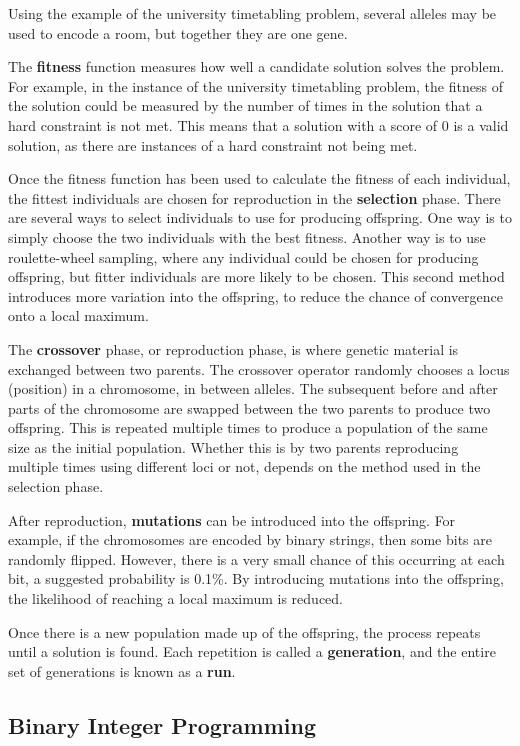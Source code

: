 \documentclass[a4paper, 12pt]{report}
\begin{document}
Using the example of the university timetabling problem, several alleles may be
used to encode a room, but together they are one gene.

The \textbf{fitness} function measures how well a candidate solution solves the
problem.
For example, in the instance of the university timetabling problem, the fitness 
of the solution could be measured by the number of times in the solution that a
hard constraint is not met.
This means that a solution with a score of 0 is a valid solution, as there are
instances of a hard constraint not being met.

Once the fitness function has been used to calculate the fitness of each
individual, the fittest individuals are chosen for reproduction in the
\textbf{selection} phase.
There are several ways to select individuals to use for producing offspring.
One way is to simply choose the two individuals with the best fitness.
Another way is to use roulette-wheel sampling, where any individual could be
chosen for producing offspring, but fitter individuals are more likely to be
chosen.
This second method introduces more variation into the offspring, to reduce the
chance of convergence onto a local maximum.

The \textbf{crossover} phase, or reproduction phase, is where genetic material
is exchanged between two parents.
The crossover operator randomly chooses a locus (position) in a chromosome,
in between alleles.
The subsequent before and after parts of the chromosome are swapped between the
two parents to produce two offspring.
This is repeated multiple times to produce a population of the same size as the
initial population.
Whether this is by two parents reproducing multiple times using different loci
or not, depends on the method used in the selection phase.

After reproduction, \textbf{mutations} can be introduced into the offspring. 
For example, if the chromosomes are encoded by binary strings, then some bits 
are randomly flipped.
However, there is a very small chance of this occurring at each bit, a suggested
probability is 0.1\%.
By introducing mutations into the offspring, the likelihood of reaching a local
maximum is reduced.

Once there is a new population made up of the offspring, the process repeats 
until a solution is found.
Each repetition is called a \textbf{generation}, and the entire set of
generations is known as a \textbf{run}.

\subsection{Binary Integer Programming}
\end{document}
